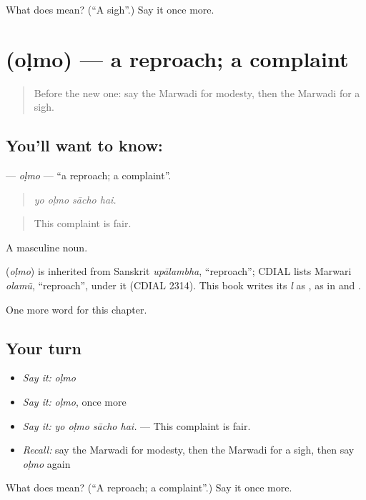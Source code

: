 \begin{tcolorbox}[breakable,colback=teal!4,colframe=teal!35!black,title={Before you move on}]
What does  mean? (\textquotedblleft{}A sigh\textquotedblright{}.) Say it once more.
\end{tcolorbox}
\section[\texorpdfstring{\mw{ओळमो} (oḷmo)}{ओळमो (oḷmo)}]{ (oḷmo) — a reproach; a complaint}

\label{lesson:MW-C257-olmo}



\begin{quote}
Before the new one: say the Marwadi for modesty, then the Marwadi for a sigh.
\end{quote}

\subsection*{You'll want to know: }
\textbf{} — \emph{oḷmo} — \textquotedblleft{}a reproach; a complaint\textquotedblright{}.

\begin{quote}
   
\end{quote}

\begin{quote}
\emph{yo oḷmo sācho hai.}
\end{quote}

\begin{quote}
This complaint is fair.
\end{quote}

A masculine noun.

\begin{cousinweb}
\textbf{} (\emph{oḷmo}) is inherited from Sanskrit \emph{upālambha}, \textquotedblleft{}reproach\textquotedblright{}; CDIAL lists Marwari \emph{olamũ}, \textquotedblleft{}reproach\textquotedblright{}, under it (CDIAL 2314). This book writes its \emph{l} as , as in \textbf{} and \textbf{}.
\end{cousinweb}

\begin{grammarlens}[title={What you've built}]
One more word for this chapter.
\end{grammarlens}

\subsection*{Your turn}
\begin{itemize}
\raggedright
  \item \emph{Say it:} \emph{oḷmo}
  \item \emph{Say it:} \emph{oḷmo}, once more
  \item \emph{Say it:} \emph{yo oḷmo sācho hai.} — This complaint is fair.
  \item \emph{Recall:} say the Marwadi for modesty, then the Marwadi for a sigh, then say \emph{oḷmo} again
\end{itemize}

\begin{tcolorbox}[breakable,colback=teal!4,colframe=teal!35!black,title={Before you move on}]
What does  mean? (\textquotedblleft{}A reproach; a complaint\textquotedblright{}.) Say it once more.
\end{tcolorbox}
